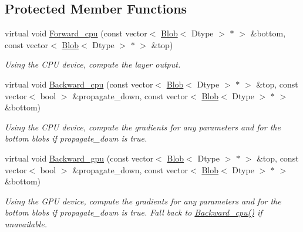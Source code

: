 \subsection*{Protected Member Functions}
\begin{DoxyCompactItemize}
\item 
virtual void \hyperlink{classcaffe_1_1DummyDataLayer_af9b443837b9b8a7e6942df57878d5fd9}{Forward\+\_\+cpu} (const vector$<$ \hyperlink{classcaffe_1_1Blob}{Blob}$<$ Dtype $>$ $\ast$ $>$ \&bottom, const vector$<$ \hyperlink{classcaffe_1_1Blob}{Blob}$<$ Dtype $>$ $\ast$ $>$ \&top)\hypertarget{classcaffe_1_1DummyDataLayer_af9b443837b9b8a7e6942df57878d5fd9}{}\label{classcaffe_1_1DummyDataLayer_af9b443837b9b8a7e6942df57878d5fd9}

\begin{DoxyCompactList}\small\item\em Using the C\+PU device, compute the layer output. \end{DoxyCompactList}\item 
virtual void \hyperlink{classcaffe_1_1DummyDataLayer_a127c0630147b43c4c99b107e4997128d}{Backward\+\_\+cpu} (const vector$<$ \hyperlink{classcaffe_1_1Blob}{Blob}$<$ Dtype $>$ $\ast$ $>$ \&top, const vector$<$ bool $>$ \&propagate\+\_\+down, const vector$<$ \hyperlink{classcaffe_1_1Blob}{Blob}$<$ Dtype $>$ $\ast$ $>$ \&bottom)\hypertarget{classcaffe_1_1DummyDataLayer_a127c0630147b43c4c99b107e4997128d}{}\label{classcaffe_1_1DummyDataLayer_a127c0630147b43c4c99b107e4997128d}

\begin{DoxyCompactList}\small\item\em Using the C\+PU device, compute the gradients for any parameters and for the bottom blobs if propagate\+\_\+down is true. \end{DoxyCompactList}\item 
virtual void \hyperlink{classcaffe_1_1DummyDataLayer_adda172e0787cae45c1d6a162de1e5a28}{Backward\+\_\+gpu} (const vector$<$ \hyperlink{classcaffe_1_1Blob}{Blob}$<$ Dtype $>$ $\ast$ $>$ \&top, const vector$<$ bool $>$ \&propagate\+\_\+down, const vector$<$ \hyperlink{classcaffe_1_1Blob}{Blob}$<$ Dtype $>$ $\ast$ $>$ \&bottom)\hypertarget{classcaffe_1_1DummyDataLayer_adda172e0787cae45c1d6a162de1e5a28}{}\label{classcaffe_1_1DummyDataLayer_adda172e0787cae45c1d6a162de1e5a28}

\begin{DoxyCompactList}\small\item\em Using the G\+PU device, compute the gradients for any parameters and for the bottom blobs if propagate\+\_\+down is true. Fall back to \hyperlink{classcaffe_1_1DummyDataLayer_a127c0630147b43c4c99b107e4997128d}{Backward\+\_\+cpu()} if unavailable. \end{DoxyCompactList}\end{DoxyCompactItemize}
